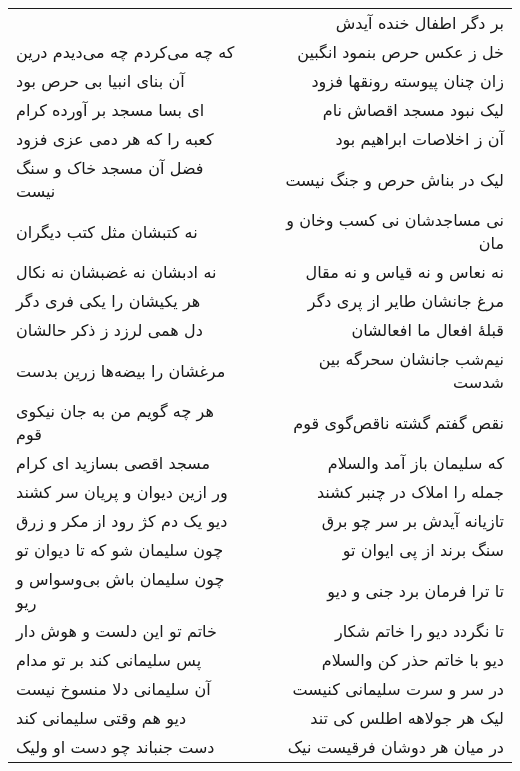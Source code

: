 \begin{center}
\begin{longtable}{l p{0.5cm} r}
&&
بر دگر اطفال خنده آیدش
\\
که چه می‌کردم چه می‌دیدم درین
&&
خل ز عکس حرص بنمود انگبین
\\
آن بنای انبیا بی حرص بود
&&
زان چنان پیوسته رونقها فزود
\\
ای بسا مسجد بر آورده کرام
&&
لیک نبود مسجد اقصاش نام
\\
کعبه را که هر دمی عزی فزود
&&
آن ز اخلاصات ابراهیم بود
\\
فضل آن مسجد خاک و سنگ نیست
&&
لیک در بناش حرص و جنگ نیست
\\
نه کتبشان مثل کتب دیگران
&&
نی مساجدشان نی کسب وخان و مان
\\
نه ادبشان نه غضبشان نه نکال
&&
نه نعاس و نه قیاس و نه مقال
\\
هر یکیشان را یکی فری دگر
&&
مرغ جانشان طایر از پری دگر
\\
دل همی لرزد ز ذکر حالشان
&&
قبلهٔ افعال ما افعالشان
\\
مرغشان را بیضه‌ها زرین بدست
&&
نیم‌شب جانشان سحرگه بین شدست
\\
هر چه گویم من به جان نیکوی قوم
&&
نقص گفتم گشته ناقص‌گوی قوم
\\
مسجد اقصی بسازید ای کرام
&&
که سلیمان باز آمد والسلام
\\
ور ازین دیوان و پریان سر کشند
&&
جمله را املاک در چنبر کشند
\\
دیو یک دم کژ رود از مکر و زرق
&&
تازیانه آیدش بر سر چو برق
\\
چون سلیمان شو که تا دیوان تو
&&
سنگ برند از پی ایوان تو
\\
چون سلیمان باش بی‌وسواس و ریو
&&
تا ترا فرمان برد جنی و دیو
\\
خاتم تو این دلست و هوش دار
&&
تا نگردد دیو را خاتم شکار
\\
پس سلیمانی کند بر تو مدام
&&
دیو با خاتم حذر کن والسلام
\\
آن سلیمانی دلا منسوخ نیست
&&
در سر و سرت سلیمانی کنیست
\\
دیو هم وقتی سلیمانی کند
&&
لیک هر جولاهه اطلس کی تند
\\
دست جنباند چو دست او ولیک
&&
در میان هر دوشان فرقیست نیک
\\
\end{longtable}
\end{center}
